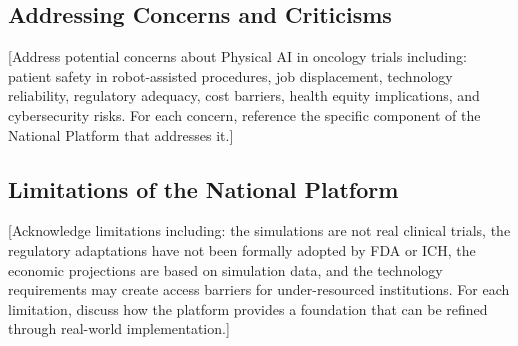 \subsection{Addressing Concerns and Criticisms}
\label{subsec:discuss-concerns}

[Address potential concerns about Physical AI in oncology trials including:
patient safety in robot-assisted procedures, job displacement, technology
reliability, regulatory adequacy, cost barriers, health equity implications,
and cybersecurity risks. For each concern, reference the specific component
of the National Platform that addresses it.]

\subsection{Limitations of the National Platform}
\label{subsec:discuss-limitations}

[Acknowledge limitations including: the simulations are not real clinical
trials, the regulatory adaptations have not been formally adopted by FDA
or ICH, the economic projections are based on simulation data, and the
technology requirements may create access barriers for under-resourced
institutions. For each limitation, discuss how the platform provides a
foundation that can be refined through real-world implementation.]
